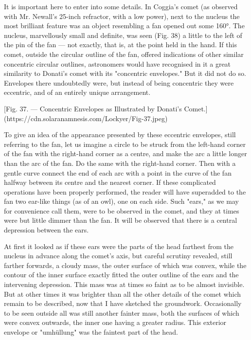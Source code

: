 \documentclass[a4paper, 12pt, oneside, polutonikogreek, english]{article}
\begin{document}
It is important here to enter into some details. In Coggia's comet (as observed with Mr. Newall's 25-inch refractor, with a low power), next to the nucleus the most brilliant feature was an object resembling a fan opened out some 160°. The nucleus, marvellously small and definite, was seen (Fig. 38) a little to the left of the pin of the fan --- not exactly, that is, at the point held in the hand. If this comet, outside the circular outline of the fan, offered indications of other similar concentric circular outlines, astronomers would have recognised in it a great similarity to Donati's comet with its "concentric envelopes." But it did not do so. Envelopes there undoubtedly were, but instead of being concentric they were eccentric, and of an entirely unique arrangement.

[Fig. 37. --- Concentric Envelopes as Illustrated by Donati's Comet.](https://cdn.solaranamnesis.com/Lockyer/Fig-37.jpeg)

To give an idea of the appearance presented by these eccentric envelopes, still referring to the fan, let us imagine a circle to be struck from the left-hand corner of the fan with the right-hand corner as a centre, and make the arc a little longer than the arc of the fan. Do the same with the right-hand corner. Then with a gentle curve connect the end of each arc with a point in the curve of the fan halfway between its centre and the nearest corner. If these complicated operations have been properly performed, the reader will have superadded to the fan two ear-like things (as of an owl), one on each side. Such "ears," as we may for convenience call them, were to be observed in the comet, and they at times were but little dimmer than the fan. It will be observed that there is a central depression between the ears.

At first it looked as if these ears were the parts of the head farthest from the nucleus in advance along the comet's axis, but careful scrutiny revealed, still farther forwards, a cloudy mass, the outer surface of which was convex, while the contour of the inner surface exactly fitted the outer outline of the ears and the intervening depression. This mass was at times so faint as to be almost invisible. But at other times it was brighter than all the other details of the comet which remain to be described, now that I have sketched the groundwork. Occasionally to be seen outside all was still another fainter mass, both the surfaces of which were convex outwards, the inner one having a greater radius. This exterior envelope or "umhüllung" was the faintest part of the head.
\end{document}
